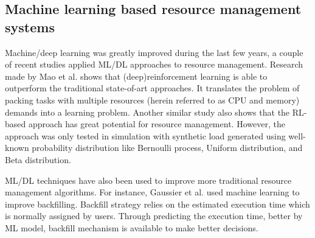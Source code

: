 \subsection{Machine learning based resource management systems}
Machine/deep learning was greatly improved during the last few years, a couple of recent studies applied ML/DL approaches to resource management.  Research made by Mao et al.\cite{mao2016resource} shows that (deep)reinforcement learning is able to outperform the traditional state-of-art approaches. 
It translates the problem of packing tasks with multiple resources (herein referred to as CPU and memory) demands into a learning problem. 
Another similar study\cite{8622393} also shows that the RL-based approach has great potential for resource management. 
However, the approach was only tested in simulation with synthetic load generated using well-known probability distribution like Bernoulli process, Uniform distribution, and Beta distribution. 

ML/DL techniques have also been used to improve more traditional resource management algorithms.
For instance, Gaussier et al.\cite{7832838} used machine learning to improve backfilling. 
Backfill strategy relies on the estimated execution time which is normally assigned by users. Through predicting the execution time, better by ML model, backfill mechanism is available to make better decisions.



